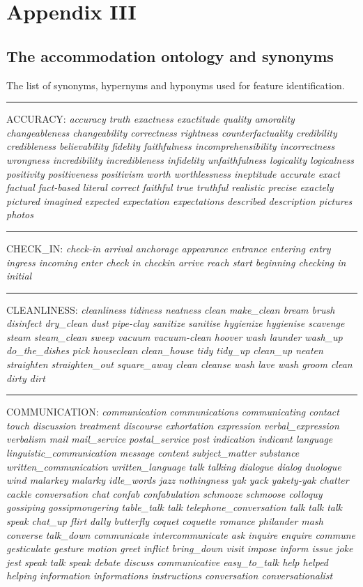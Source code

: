 \chapter{Appendix III}
\label{app3}
\section{The accommodation ontology and synonyms}
The list of synonyms, hypernyms and hyponyms used for feature identification.

\noindent\rule{16cm}{0.4pt}

ACCURACY:
\textit{accuracy
truth
exactness
exactitude
quality
amorality
changeableness
changeability
correctness
rightness
counterfactuality
credibility
credibleness
believability
fidelity
faithfulness
incomprehensibility
incorrectness
wrongness
incredibility
incredibleness
infidelity
unfaithfulness
logicality
logicalness
positivity
positiveness
positivism
worth
worthlessness
ineptitude
accurate
exact
factual
fact-based
literal
correct
faithful
true
truthful
realistic
precise
exactely
pictured
imagined
expected
expectation
expectations
described
description
pictures
photos}

\noindent\rule{16cm}{0.4pt}

CHECK\_IN: 
\textit{check-in
arrival
anchorage
appearance
entrance
entering
entry
ingress
incoming
enter
check in
checkin
arrive
reach
start
beginning
checking in
initial}

\noindent\rule{16cm}{0.4pt}

CLEANLINESS: \textit{cleanliness
tidiness
neatness
clean
make\_clean
bream
brush
disinfect
dry\_clean
dust
pipe-clay
sanitize
sanitise
hygienize
hygienise
scavenge
steam
steam\_clean
sweep
vacuum
vacuum-clean
hoover
wash
launder
wash\_up
do\_the\_dishes
pick
houseclean
clean\_house
tidy
tidy\_up
clean\_up
neaten
straighten
straighten\_out
square\_away
clean
cleanse
wash
lave
wash
groom
clean
dirty
dirt
}

\noindent\rule{16cm}{0.4pt}

COMMUNICATION: 
\textit{communication
communications
communicating
contact
touch
discussion
treatment
discourse
exhortation
expression
verbal\_expression
verbalism
mail
mail\_service
postal\_service
post
indication
indicant
language
linguistic\_communication
message
content
subject\_matter
substance
written\_communication
written\_language
talk
talking
dialogue
dialog
duologue
wind
malarkey
malarky
idle\_words
jazz
nothingness
yak
yack
yakety-yak
chatter
cackle
conversation
chat
confab
confabulation
schmooze
schmoose
colloquy
gossiping
gossipmongering
table\_talk
talk
telephone\_conversation
talk
talk
talk
speak
chat\_up
flirt
dally
butterfly
coquet
coquette
romance
philander
mash
converse
talk\_down
communicate
intercommunicate
ask
inquire
enquire
commune
gesticulate
gesture
motion
greet
inflict
bring\_down
visit
impose
inform
issue
joke
jest
speak
talk
speak
debate
discuss
communicative
easy\_to\_talk
help
helped
helping
information
informations
instructions
conversation
conversationalist}


